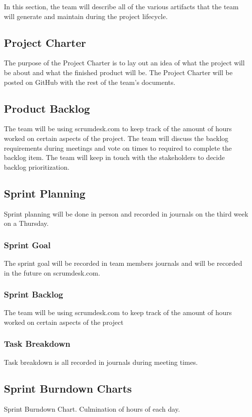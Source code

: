 In this section, the team will describe all of the various artifacts that the team will generate and maintain during the project lifecycle.

\subsection{Project Charter}
The purpose of the Project Charter is to lay out an idea of what the project will be about and what the finished product will be. The Project Charter will be posted on GitHub with the rest of the team's documents.

\subsection{Product Backlog}
The team will be using scrumdesk.com to keep track of the amount of hours worked on certain aspects of the project. The team will discuss the backlog requirements during meetings and vote on times to required to complete the backlog item. The team will keep in touch with the stakeholders to decide backlog prioritization.

\subsection{Sprint Planning}
Sprint planning will be done in person and recorded in journals on the third week on a Thursday.

\subsubsection{Sprint Goal}
The sprint goal will be recorded in team members journals and will be recorded in the future on scrumdesk.com.

\subsubsection{Sprint Backlog}
The team will be using scrumdesk.com to keep track of the amount of hours worked on certain aspects of the project

\subsubsection{Task Breakdown}
Task breakdown is all recorded in journals during meeting times.

\subsection{Sprint Burndown Charts}
Sprint Burndown Chart. Culmination of hours of each day.

